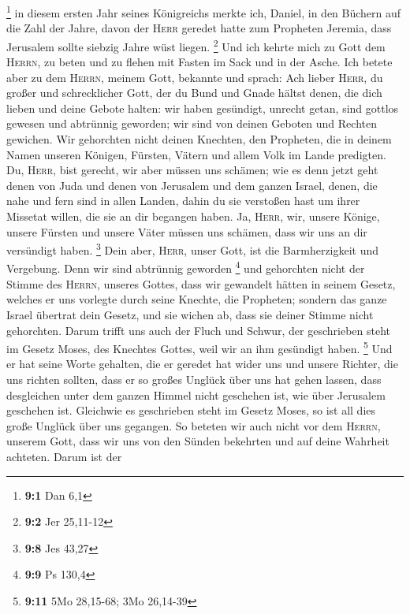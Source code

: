 \footnote{\textbf{9:1} Dan 6,1}  in diesem ersten Jahr
seines Königreichs merkte ich, Daniel, in den Büchern auf die Zahl der
Jahre, davon der \textsc{Herr} geredet hatte zum Propheten Jeremia, dass
Jerusalem sollte siebzig Jahre wüst liegen. \footnote{\textbf{9:2} Jer
  25,11-12}  Und ich kehrte mich zu Gott dem
\textsc{Herrn}, zu beten und zu flehen mit Fasten im Sack und in der
Asche.  Ich betete aber zu dem \textsc{Herrn}, meinem
Gott, bekannte und sprach: Ach lieber \textsc{Herr}, du großer und
schrecklicher Gott, der du Bund und Gnade hältst denen, die dich lieben
und deine Gebote halten:  wir haben gesündigt, unrecht
getan, sind gottlos gewesen und abtrünnig geworden; wir sind von deinen
Geboten und Rechten gewichen.  Wir gehorchten nicht deinen
Knechten, den Propheten, die in deinem Namen unseren Königen, Fürsten,
Vätern und allem Volk im Lande predigten.  Du,
\textsc{Herr}, bist gerecht, wir aber müssen uns schämen; wie es denn
jetzt geht denen von Juda und denen von Jerusalem und dem ganzen Israel,
denen, die nahe und fern sind in allen Landen, dahin du sie verstoßen
hast um ihrer Missetat willen, die sie an dir begangen haben.
 Ja, \textsc{Herr}, wir, unsere Könige, unsere Fürsten und
unsere Väter müssen uns schämen, dass wir uns an dir versündigt haben.
\footnote{\textbf{9:8} Jes 43,27}  Dein aber,
\textsc{Herr}, unser Gott, ist die Barmherzigkeit und Vergebung. Denn
wir sind abtrünnig geworden \footnote{\textbf{9:9} Ps 130,4}
 und gehorchten nicht der Stimme des \textsc{Herrn},
unseres Gottes, dass wir gewandelt hätten in seinem Gesetz, welches er
uns vorlegte durch seine Knechte, die Propheten;  sondern
das ganze Israel übertrat dein Gesetz, und sie wichen ab, dass sie
deiner Stimme nicht gehorchten. Darum trifft uns auch der Fluch und
Schwur, der geschrieben steht im Gesetz Moses, des Knechtes Gottes, weil
wir an ihm gesündigt haben. \footnote{\textbf{9:11} 5Mo 28,15-68; 3Mo
  26,14-39}  Und er hat seine Worte gehalten, die er
geredet hat wider uns und unsere Richter, die uns richten sollten, dass
er so großes Unglück über uns hat gehen lassen, dass desgleichen unter
dem ganzen Himmel nicht geschehen ist, wie über Jerusalem geschehen ist.
 Gleichwie es geschrieben steht im Gesetz Moses, so ist
all dies große Unglück über uns gegangen. So beteten wir auch nicht vor
dem \textsc{Herrn}, unserem Gott, dass wir uns von den Sünden bekehrten
und auf deine Wahrheit achteten.  Darum ist der
